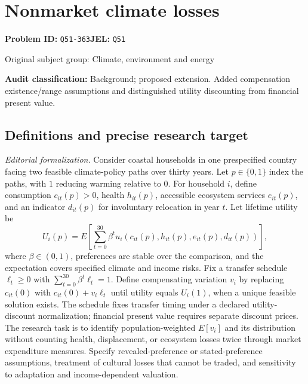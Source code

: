 \documentclass[11pt,a4paper]{article}
\begin{document}
\section*{Nonmarket climate losses}
\textbf{Problem ID:} \texttt{Q51-363}\quad \textbf{JEL:} \texttt{Q51}\par
\label{problem:OP-0432}
{\sffamily\small\color{muted}Original subject group: Climate, environment and energy\par}
\label{definitions:problem:30007714}
\textbf{Audit classification:} Background; proposed extension. Added compensation existence/range assumptions and distinguished utility discounting from financial present value.
\subsection*{Definitions and precise research target}
\textit{Editorial formalization.} Consider coastal households in one prespecified country facing two feasible climate-policy paths over thirty years. Let \(p\in\{0,1\}\) index the paths, with \(1\) reducing warming relative to \(0\). For household \(i\), define consumption \(c_{it}(p)>0\), health \(h_{it}(p)\), accessible ecosystem services \(e_{it}(p)\), and an indicator \(d_{it}(p)\) for involuntary relocation in year \(t\). Let lifetime utility be
\[U_i(p)=E\!\left[\sum_{t=0}^{30}\beta^t u_i(c_{it}(p),h_{it}(p),e_{it}(p),d_{it}(p))\right],\]
where \(\beta\in(0,1)\), preferences are stable over the comparison, and the expectation covers specified climate and income risks. Fix a transfer schedule \(\ell_t\geq0\) with \(\sum_{t=0}^{30}\beta^t\ell_t=1\). Define compensating variation \(v_i\) by replacing \(c_{it}(0)\) with \(c_{it}(0)+v_i\ell_t\) until utility equals \(U_i(1)\), when a unique feasible solution exists. The schedule fixes transfer timing under a declared utility-discount normalization; financial present value requires separate discount prices. The research task is to identify population-weighted \(E[v_i]\) and its distribution without counting health, displacement, or ecosystem losses twice through market expenditure measures. Specify revealed-preference or stated-preference assumptions, treatment of cultural losses that cannot be traded, and sensitivity to adaptation and income-dependent valuation.
\end{document}
